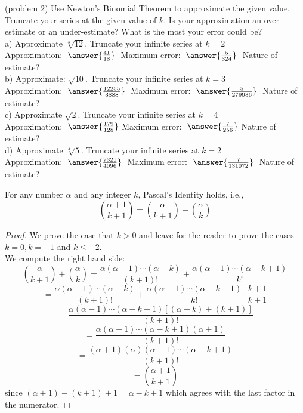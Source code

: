 \documentclass[handout]{ximera}
\begin{document}
\begin{problem}(problem 2) Use Newton's Binomial Theorem to approximate the given value. Truncate your series at the given value of $k$.
 Is your approximation an over-estimate or an under-estimate? What is the most your error could be?\\
a) Approximate $\sqrt[3]{12}$. Truncate your infinite series at $k = 2$ \\
Approximation: $\; \answer{\frac{41}{18}}\;$  
Maximum error: $\; \answer{\frac{5}{324}}\; $
Nature of estimate? 
 \\

b) Approximate: $\sqrt{10}$. Truncate your infinite series at $k = 3$ \\ 
Approximation: $\; \answer{\frac{12255}{3888}}\;$ 
Maximum error: $\; \answer{\frac{5}{279936}}\;$ 
Nature of estimate? \\

c) Approximate $\sqrt{2}$. Truncate your infinite series at $k = 4$ \\ 
Approximation: $\; \answer{\frac{179}{128}}$ 
Maximum error: $\; \answer{\frac{7}{256}}$
Nature of estimate? \\

d) Approximate $\sqrt[4]{5}$. Truncate your infinite series at $k = 2$ \\ 
Approximation: $\; \answer{\frac{7321}{4096}}\;$ 
Maximum error: $\; \answer{\frac{7}{131072}}\;$ 
Nature of estimate? \\


\end{problem}

\begin{proposition}
For any number $\alpha$ and any integer $k$, Pascal's Identity holds, i.e.,
\[
\binom{\alpha +1}{k+1} = \binom{\alpha}{k+1}+\binom{\alpha}{k}
\]
\end{proposition}

\begin{proof}
We prove the case that $k > 0$ and leave for the reader to prove the cases $k=0, k = -1$ and $k \leq -2$.\\
We compute the right hand side:
\[
\binom{\alpha}{k+1}+\binom{\alpha}{k} = \frac{\alpha (\alpha - 1) \cdots (\alpha -k)}{(k+1)!} + 
\frac{\alpha (\alpha - 1) \cdots (\alpha -k+1)}{k!}
\]
\[
= \frac{\alpha (\alpha - 1) \cdots (\alpha -k)}{(k+1)!} + \frac{\alpha (\alpha - 1) \cdots (\alpha -k+1)}{k!} \cdot \frac{k+1}{k+1}
\]
\[
= \frac{\alpha (\alpha - 1) \cdots (\alpha -k + 1)[(\alpha -k) + (k+1)]}{(k+1)!}
\]
\[
= \frac{\alpha (\alpha - 1) \cdots (\alpha -k + 1)(\alpha +1)}{(k+1)!}
\]
\[
= \frac{(\alpha +1)(\alpha) (\alpha - 1) \cdots (\alpha -k + 1)}{(k+1)!}
\]
\[
=\binom{\alpha+1}{k+1}
\]
since $(\alpha + 1) - (k+1) +1 = \alpha -k +1$ which agrees with the last factor in the numerator.
\end{proof}
\end{document}

